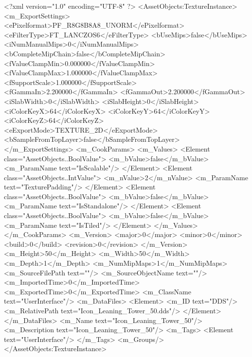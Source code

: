 <?xml version="1.0" encoding="UTF-8" ?>
<AssetObjects:TextureInstance>
<m_ExportSettings>
<ePixelformat>PF_R8G8B8A8_UNORM</ePixelformat>
<eFilterType>FT_LANCZOS6</eFilterType>
<bUseMips>false</bUseMips>
<iNumManualMips>0</iNumManualMips>
<bCompleteMipChain>false</bCompleteMipChain>
<fValueClampMin>0.000000</fValueClampMin>
<fValueClampMax>1.000000</fValueClampMax>
<fSupportScale>1.000000</fSupportScale>
<fGammaIn>2.200000</fGammaIn>
<fGammaOut>2.200000</fGammaOut>
<iSlabWidth>0</iSlabWidth>
<iSlabHeight>0</iSlabHeight>
<iColorKeyX>64</iColorKeyX>
<iColorKeyY>64</iColorKeyY>
<iColorKeyZ>64</iColorKeyZ>
<eExportMode>TEXTURE_2D</eExportMode>
<bSampleFromTopLayer>false</bSampleFromTopLayer>
</m_ExportSettings>
<m_CookParams>
<m_Values>
<Element class="AssetObjects..BoolValue">
<m_bValue>false</m_bValue>
<m_ParamName text="IsScalable"/>
</Element>
<Element class="AssetObjects..IntValue">
<m_nValue>2</m_nValue>
<m_ParamName text="TexturePadding"/>
</Element>
<Element class="AssetObjects..BoolValue">
<m_bValue>false</m_bValue>
<m_ParamName text="IsStandalone"/>
</Element>
<Element class="AssetObjects..BoolValue">
<m_bValue>false</m_bValue>
<m_ParamName text="IsTiled"/>
</Element>
</m_Values>
</m_CookParams>
<m_Version>
<major>0</major>
<minor>0</minor>
<build>0</build>
<revision>0</revision>
</m_Version>
<m_Height>50</m_Height>
<m_Width>50</m_Width>
<m_Depth>1</m_Depth>
<m_NumMipMaps>1</m_NumMipMaps>
<m_SourceFilePath text=""/>
<m_SourceObjectName text=""/>
<m_ImportedTime>0</m_ImportedTime>
<m_ExportedTime>0</m_ExportedTime>
<m_ClassName text="UserInterface"/>
<m_DataFiles>
<Element>
<m_ID text="DDS"/>
<m_RelativePath text="Icon_Leaning_Tower_50.dds"/>
</Element>
</m_DataFiles>
<m_Name text="Icon_Leaning_Tower_50"/>
<m_Description text="Icon_Leaning_Tower_50"/>
<m_Tags>
<Element text="UserInterface"/>
</m_Tags>
<m_Groups/>
</AssetObjects:TextureInstance>
